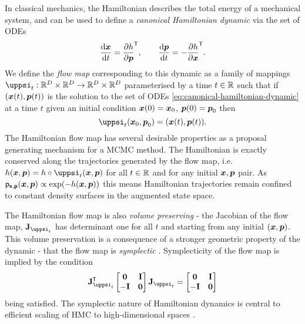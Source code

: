 In classical mechanics, the Hamiltonian describes the total energy of a mechanical system, and can be used to define a \emph{canonical Hamiltonian dynamic} via the set of \acp{ODE} 
\begin{equation}\label{eq:canonical-hamiltonian-dynamic}
  \frac{\mathrm{d} \boldsymbol{x}}{\mathrm{d} t} = \frac{\partial h}{\partial \boldsymbol{p}}^{\mkern-1.5mu\mathsf{T}},
  \qquad
  \frac{\mathrm{d} \boldsymbol{p}}{\mathrm{d} t} = -\frac{\partial h}{\partial \boldsymbol{x}}^{\mkern-1.5mu\mathsf{T}}.
\end{equation}
We define the \emph{flow map} corresponding to this dynamic as a family of mappings $\flowmap_t : \reals^D \times \reals^D \to \reals^D \times \reals^D$ parameterised by a time $t \in \mathbb{R}$ such that if $\lpa \vct{x}(t),\vct{p}(t) \rpa$ is the solution to the set of \acp{ODE} \eqref{eq:canonical-hamiltonian-dynamic} at a time $t$ given an initial condition $\boldsymbol{x}(0) = \boldsymbol{x}_0$, $\boldsymbol{p}(0) = \boldsymbol{p}_0$ then
\begin{equation}\label{eq:flow-map-definition}
  \flowmap_t(\vct{x}_0,\vct{p}_0) = \lpa \vct{x}(t),\vct{p}(t) \rpa.
\end{equation}
The Hamiltonian flow map has several desirable properties as a proposal generating mechanism for a \ac{MCMC} method. The Hamiltonian is exactly conserved along the trajectories generated by the flow map, i.e. $\hamiltonian(\vct{x},\vct{p}) = \hamiltonian\circ\flowmap_t(\vct{x},\vct{p})$ for all $t \in \mathbb{R}$ and for any initial $\boldsymbol{x},\boldsymbol{p}$ pair. As $\pden{\rvct{x},\rvct{p}}(\vct{x},\vct{p}) \propto \exp\lpa-\hamiltonian(\vct{x},\vct{p})\rpa$ this means Hamiltonian trajectories remain confined to constant density surfaces in the augmented state space. 

The Hamiltonian flow map is also \emph{volume preserving} - the Jacobian of the flow map, $\jacobian{\flowmap_t}$ has determinant one for all $t$ and starting from any initial $(\boldsymbol{x},\boldsymbol{p})$. This volume preservation is a consequence of a stronger geometric property of the dynamic - that the flow map is \emph{symplectic} \citep{leimkuhler2004simulating}. Symplecticity of the flow map is implied by the condition
\begin{equation}
\jacobian{\flowmap_t}\tr\, \begin{bmatrix} \mathbf{0} & \idmtx \\ -\idmtx & \mathbf{0} \end{bmatrix} \,\jacobian{\flowmap_t} = \begin{bmatrix} \mathbf{0} & \idmtx \\ -\idmtx & \mathbf{0} \end{bmatrix}
\end{equation} 
being satisfied. The symplectic nature of Hamiltonian dynamics is central to efficient scaling of \ac{HMC} to high-dimensional spaces \citep{neal2011mcmc,betancourt2017geometric}.

